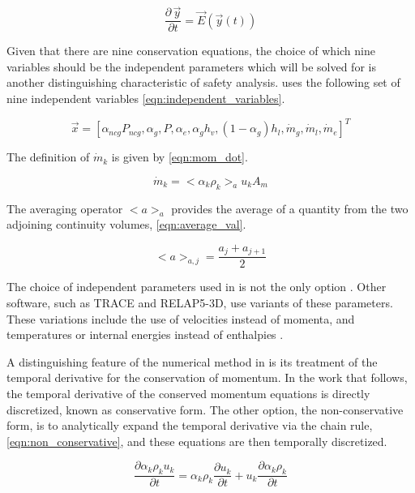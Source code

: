\begin{equation}
\label{eqn:temporal_semi_discrete}
\frac{\partial \,\vec{y} }{\partial t} = \vec{E}(\vec{y}(t))
\end{equation}

Given that there are nine conservation equations, the choice of which nine variables should be the independent parameters which will be solved for is another distinguishing characteristic of safety analysis.
\cobra{} uses the following set of nine independent variables \eqref{eqn:independent_variables}.

\begin{equation}
\label{eqn:independent_variables}
\vec{x} = [\alpha_{ncg}P_{ncg}, \alpha_g, P, \alpha_e, \alpha_g h_v, (1 - \alpha_g) h_l, \dot{m}_g, \dot{m}_l, \dot{m}_e]^{T}
\end{equation}

The definition of $\dot{m}_k$ is given by \eqref{eqn:mom_dot}.

\begin{equation}
\label{eqn:mom_dot}
\dot{m}_{k} = <\alpha_k \rho_k>_{a} u_{k} A_{m}
\end{equation}

The averaging operator $<a>_{a}$ provides the average of a quantity from the two adjoining continuity volumes, \eqref{eqn:average_val}.

\begin{equation}
\label{eqn:average_val}
<a>_{a,j} = \frac{a_{j} + a_{j+1}}{2}
\end{equation}

The choice of independent parameters used in \cobra{} is not the only option .
Other software, such as TRACE and RELAP5-3D, use variants of these parameters.
These variations include the use of velocities instead of momenta, and temperatures or internal energies instead of enthalpies \cite{RELAP, TRACE}.

A distinguishing feature of the numerical method in \cobra{} is its treatment of the temporal derivative for the conservation of momentum.
In the work that follows, the temporal derivative of the conserved momentum equations is directly discretized, known as conservative form.
The other option, the non-conservative form, is to analytically expand the temporal derivative via the chain rule, \eqref{eqn:non_conservative}, and these equations are then temporally discretized.

\begin{equation}
\label{eqn:non_conservative}
\frac{\partial \alpha_k \rho_k u_k}{\partial t} = \alpha_k \rho_k \frac{\partial u_k}{\partial t} + u_k \frac{\partial \alpha_k \rho_k}{\partial t}
\end{equation}

